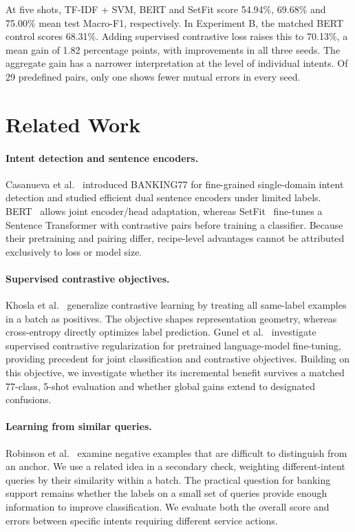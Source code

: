 \documentclass[runningheads]{llncs}
\begin{document}
At five shots, TF-IDF + SVM, BERT and SetFit score 54.94\%, 69.68\% and 75.00\% mean test Macro-F1, respectively. In Experiment B, the matched BERT control scores 68.31\%. Adding supervised contrastive loss raises this to 70.13\%, a mean gain of 1.82 percentage points, with improvements in all three seeds. The aggregate gain has a narrower interpretation at the level of individual intents. Of 29 predefined pairs, only one shows fewer mutual errors in every seed.

\section{Related Work}
\paragraph{Intent detection and sentence encoders.}
Casanueva et al.~\cite{banking} introduced BANKING77 for fine-grained single-domain intent detection and studied efficient dual sentence encoders under limited labels. BERT~\cite{bert} allows joint encoder/head adaptation, whereas SetFit~\cite{setfit} fine-tunes a Sentence Transformer with contrastive pairs before training a classifier. Because their pretraining and pairing differ, recipe-level advantages cannot be attributed exclusively to loss or model size.

\paragraph{Supervised contrastive objectives.}
Khosla et al.~\cite{supcon} generalize contrastive learning by treating all same-label examples in a batch as positives. The objective shapes representation geometry, whereas cross-entropy directly optimizes label prediction. Gunel et al.~\cite{gunel} investigate supervised contrastive regularization for pretrained language-model fine-tuning, providing precedent for joint classification and contrastive objectives. Building on this objective, we investigate whether its incremental benefit survives a matched 77-class, 5-shot evaluation and whether global gains extend to designated confusions.

\paragraph{Learning from similar queries.}
Robinson et al.~\cite{hard} examine negative examples that are difficult to distinguish from an anchor. We use a related idea in a secondary check, weighting different-intent queries by their similarity within a batch. The practical question for banking support remains whether the labels on a small set of queries provide enough information to improve classification. We evaluate both the overall score and errors between specific intents requiring different service actions.
\end{document}
